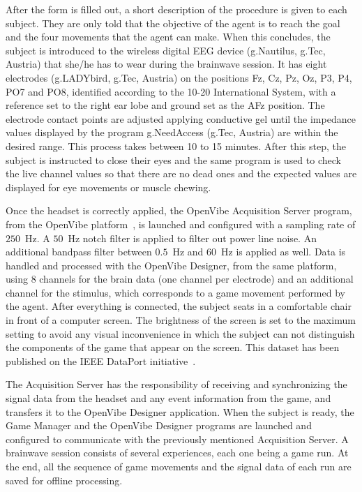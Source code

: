 \documentclass[journal]{IEEEtran}
\begin{document}
After the form is filled out, a short description of the procedure is given to each subject. They are only told that the objective of the agent is to reach the goal and the four movements that the agent can make. When this concludes, the subject is introduced to the wireless digital EEG device (g.Nautilus, g.Tec, Austria) that she/he has to wear during the brainwave session. It has eight electrodes (g.LADYbird, g.Tec, Austria) on the positions Fz, Cz, Pz, Oz, P3, P4, PO7 and PO8, identified according to the 10-20 International System, with a reference set to the right ear lobe and ground set as the AFz position. The electrode contact points are adjusted applying conductive gel until the impedance values displayed by the program g.NeedAccess (g.Tec, Austria) are within the desired range. This process takes between 10 to 15 minutes. After this step, the subject is instructed to close their eyes and the same program is used to check the live channel values so that there are no dead ones and the expected values are displayed for eye movements or muscle chewing.

Once the headset is correctly applied, the OpenVibe Acquisition Server program, from the OpenVibe platform~\cite{OPEN-VIBE-PAPER}, is launched and configured with a sampling rate of $250$~Hz. A $50$~Hz notch filter is applied to filter out power line noise. An additional bandpass filter between $0.5$~Hz and $60$~Hz is applied as well. Data is handled and processed with the OpenVibe Designer, from the same platform, using 8 channels for the brain data (one channel per electrode) and an additional channel for the stimulus, which corresponds to a game movement performed by the agent.  After everything is connected, the subject seats in a comfortable chair in front of a computer screen. The brightness of the screen is set to the maximum setting to avoid any visual inconvenience in which the subject can not distinguish the components of the game that appear on the screen.  This dataset has been published on the IEEE DataPort initiative~\cite{6emh-wb46-19}.


The Acquisition Server has the responsibility of receiving and synchronizing the signal data from the headset and any event information from the game, and transfers it to the OpenVibe Designer application. When the subject is ready, the Game Manager and the OpenVibe Designer programs are launched and configured to communicate with the previously mentioned Acquisition Server. A brainwave session consists of several experiences, each one being a game run.  At the end, all the sequence of game movements and the signal data of each run are saved for offline processing.
\end{document}
